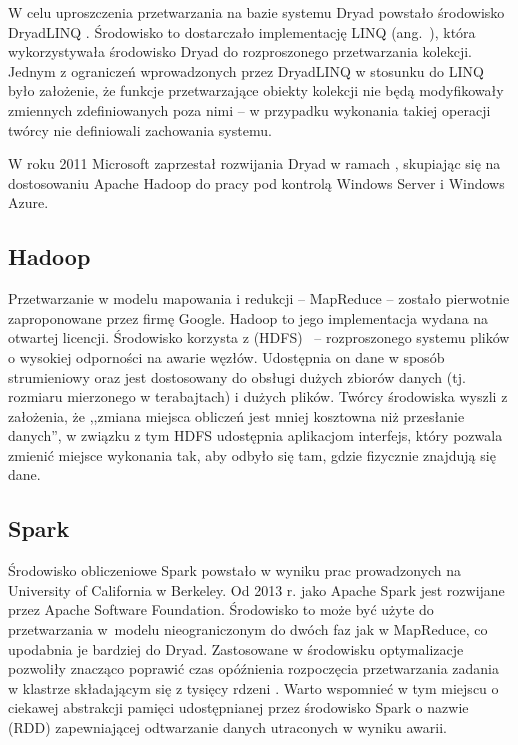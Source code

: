 W celu uproszczenia przetwarzania na bazie systemu Dryad powstało
środowisko DryadLINQ \cite{DryadLINQ-MSR}. Środowisko to dostarczało
implementację LINQ (ang.~), która
wykorzystywała środowisko Dryad do rozproszonego przetwarzania kolekcji.
Jednym z ograniczeń wprowadzonych przez DryadLINQ w stosunku do LINQ
było założenie, że funkcje przetwarzające obiekty kolekcji nie będą
modyfikowały zmiennych zdefiniowanych poza nimi -- w przypadku wykonania
takiej operacji twórcy nie definiowali zachowania systemu.

W roku 2011 Microsoft zaprzestał rozwijania Dryad w ramach 
\cite{DryadLINQ-discarded}, skupiając się na dostosowaniu Apache
Hadoop do pracy pod kontrolą Windows Server i Windows Azure.


\subsection{Hadoop}

Przetwarzanie w modelu mapowania i redukcji -- MapReduce \cite{Google-MapReduce}
-- zostało pierwotnie zaproponowane przez firmę Google. Hadoop to
jego implementacja wydana na otwartej licencji. Środowisko korzysta
z  (HDFS)~\cite{HDFS-Architecture-Guide}
-- rozproszonego systemu plików o wysokiej odporności na awarie węzłów.
Udostępnia on dane w sposób strumieniowy oraz jest dostosowany do
obsługi dużych zbiorów danych (tj. rozmiaru mierzonego w terabajtach)
i dużych plików. Twórcy środowiska wyszli z założenia, że ,,zmiana
miejsca obliczeń jest mniej kosztowna niż przesłanie danych'', w związku
z tym HDFS udostępnia aplikacjom interfejs, który pozwala zmienić
miejsce wykonania tak, aby odbyło się tam, gdzie fizycznie znajdują
się dane. 


\subsection{Spark}

Środowisko obliczeniowe Spark \cite{Spark-Berkeley} powstało w wyniku
prac prowadzonych na University of California w Berkeley. Od 2013
r. jako Apache Spark jest rozwijane przez Apache Software Foundation.
Środowisko to może być użyte do przetwarzania w~modelu nieograniczonym
do dwóch faz jak w MapReduce, co upodabnia je bardziej do Dryad. Zastosowane
w środowisku optymalizacje pozwoliły znacząco poprawić czas opóźnienia
rozpoczęcia przetwarzania zadania w klastrze składającym się z tysięcy
rdzeni \cite{Spark-Berkeley-Performance}. Warto wspomnieć w tym miejscu
o ciekawej abstrakcji pamięci udostępnianej przez środowisko Spark
o nazwie  (RDD) zapewniającej
odtwarzanie danych utraconych w wyniku awarii. 


